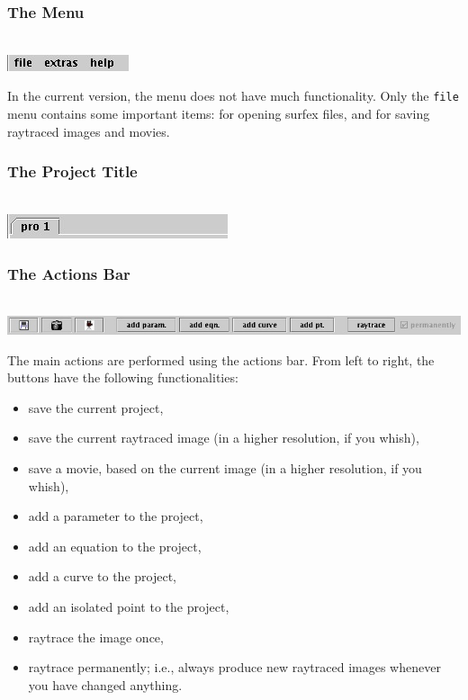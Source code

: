 \documentclass{article}
\newcommand{\surfex}{{\sc surfex}}
\begin{document}
%
\subsubsection{The Menu}

\ \\\includegraphics[scale=0.75]{surfex_menu_bar}

In the current version, the menu does not have much functionality. 
Only the {\tt file} menu contains some important items: 
for opening \surfex{} files, and for saving raytraced images and movies.

%
\subsubsection{The Project Title}

\ \\\includegraphics[scale=0.6]{surfex_project_title}


%
\subsubsection{The Actions Bar}

\ \\\includegraphics[scale=0.35]{surfex_actions_bar}

The main actions are performed using the actions bar. 
From left to right, the buttons have the following functionalities:
\begin{itemize}
\item save the current project, 
\item save the current raytraced image (in a higher resolution, if you whish), 
\item save a movie, based on the current image (in a higher resolution, if you whish), 
\item add a parameter to the project, 
\item add an equation to the project, 
\item add a curve to the project, 
\item add an isolated point to the project,
\item raytrace the image once,
\item raytrace permanently; i.e., always produce new raytraced images whenever
  you have changed anything.
\end{itemize}
\end{document}
